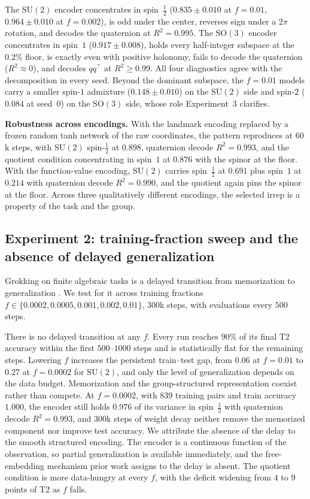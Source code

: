 \documentclass{article}
\newcommand{\SU}{\mathrm{SU}}
\newcommand{\SO}{\mathrm{SO}}
\begin{document}
The $\SU(2)$ encoder concentrates in spin~$\tfrac12$
($0.835 \pm 0.010$ at $f = 0.01$, $0.964 \pm 0.010$ at $f = 0.002$),
is odd under the center, reverses sign under a $2\pi$ rotation, and
decodes the quaternion at $R^2 = 0.995$. The $\SO(3)$ encoder
concentrates in spin~$1$ ($0.917 \pm 0.008$), holds every half-integer
subspace at the $0.2\%$ floor, is exactly even with positive holonomy,
fails to decode the quaternion ($R^2 \approx 0$), and decodes
$qq^\top$ at $R^2 \geq 0.99$. All four diagnostics agree with the
decomposition in every seed. Beyond the dominant subspace, the
$f = 0.01$ models carry a smaller spin-$1$ admixture ($0.148 \pm
0.010$) on the $\SU(2)$ side and spin-$2$ ($0.084$ at seed~0) on the
$\SO(3)$ side, whose role Experiment~3 clarifies.

\textbf{Robustness across encodings.} With the landmark encoding
replaced by a frozen random tanh network of the raw coordinates, the
pattern reproduces at $60$k steps, with $\SU(2)$ spin-$\tfrac12$ at
$0.898$, quaternion decode $R^2 = 0.993$, and the quotient condition
concentrating in spin~$1$ at $0.876$ with the spinor at the floor.
With the function-value encoding, $\SU(2)$ carries spin~$\tfrac12$ at
$0.691$ plus spin~$1$ at $0.214$ with quaternion decode
$R^2 = 0.990$, and the quotient again pins the spinor at the floor.
Across three qualitatively different encodings, the selected irrep is
a property of the task and the group.

\subsection{Experiment 2: training-fraction sweep and the absence of
delayed generalization}

Grokking on finite algebraic tasks is a delayed transition from
memorization to generalization \cite{power2022, nanda2023}. We test
for it across training fractions
$f \in \{0.0002, 0.0005, 0.001, 0.002, 0.01\}$, $300$k steps, with
evaluations every $500$ steps.

There is no delayed transition at any $f$. Every run reaches $90\%$
of its final T2 accuracy within the first $500$--$1000$ steps and is
statistically flat for the remaining steps. Lowering $f$ increases
the persistent train--test gap, from $0.06$ at $f = 0.01$ to $0.27$
at $f = 0.0002$ for $\SU(2)$, and only the level of generalization
depends on the data budget. Memorization and the group-structured
representation coexist rather than compete. At $f = 0.0002$, with
$839$ training pairs and train accuracy $1.000$, the encoder still
holds $0.976$ of its variance in spin~$\tfrac12$ with quaternion
decode $R^2 = 0.993$, and $300$k steps of weight decay neither remove
the memorized component nor improve test accuracy. We attribute the
absence of the delay to the smooth structured encoding. The encoder
is a continuous function of the observation, so partial
generalization is available immediately, and the free-embedding
mechanism prior work assigns to the delay is absent. The quotient
condition is more data-hungry at every $f$, with the deficit widening
from $4$ to $9$ points of T2 as $f$ falls.
\end{document}
